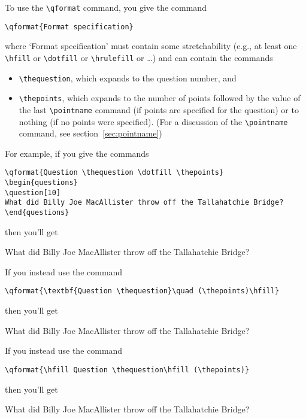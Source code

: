\documentclass[12pt]{exam}
\begin{document}
To use the \verb"\qformat" command, you give the command
\begin{center}
  \verb"\qformat{Format specification}"
\end{center}
where `Format specification' must contain some stretchability (e.g.,
at least one \verb"\hfill" or \verb"\dotfill" or \verb"\hrulefill" or
\ldots) and can contain the commands
\begin{itemize}
\item \verb"\thequestion", which expands to the question number, and
\item \verb"\thepoints", which expands to the number of points
  followed by the value of the last \verb"\pointname" command (if
  points are specified for the question) or to nothing (if no points
  were specified).  (For a discussion of the \verb"\pointname"
  command, see section~\ref{sec:pointname})
\end{itemize}
For example, if you give the commands
\pointname{ \points}
%
\begin{verbatim}
\qformat{Question \thequestion \dotfill \thepoints}
\begin{questions}
\question[10]
What did Billy Joe MacAllister throw off the Tallahatchie Bridge?
\end{questions}
\end{verbatim}
%
then you'll get
\begin{questions}
\question[10]
What did Billy Joe MacAllister throw off the Tallahatchie Bridge?
\end{questions}
%
\medskip
If you instead use the command
\begin{verbatim}
\qformat{\textbf{Question \thequestion}\quad (\thepoints)\hfill}
\end{verbatim}
then you'll get
\begin{questions}
\question[10]
What did Billy Joe MacAllister throw off the Tallahatchie Bridge?
\end{questions}
%
\medskip
If you instead use the command
\begin{verbatim}
\qformat{\hfill Question \thequestion\hfill (\thepoints)}
\end{verbatim}
then you'll get
\begin{questions}
\question[10]
What did Billy Joe MacAllister throw off the Tallahatchie Bridge?
\end{questions}
\noqformat
\end{document}
